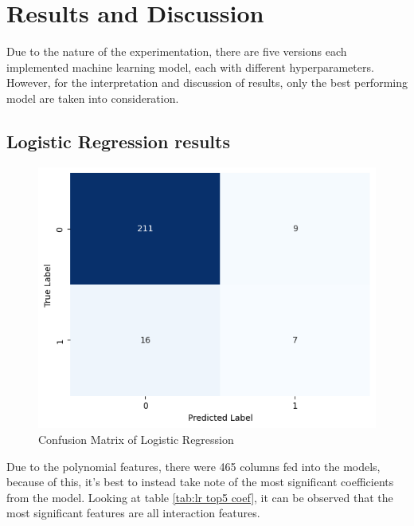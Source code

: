 \section{Results and Discussion}

Due to the nature of the experimentation, there are five versions each implemented machine learning model, each with different hyperparameters. However, for the interpretation and discussion of results, only the best performing model are taken into consideration. 

\subsection{Logistic Regression results}

\begin{figure}[H]
    \centering
    \includegraphics[width=\linewidth]{figures/log_confu.png}
    \caption{Confusion Matrix of Logistic Regression}
    \label{fig:tts cv}
\end{figure}

Due to the polynomial features, there were 465 columns fed into the models, because of this, it's best to instead take note of the most significant coefficients from the model. Looking at table \ref{tab:lr top5 coef}, it can be observed that the most significant features are all interaction features.

